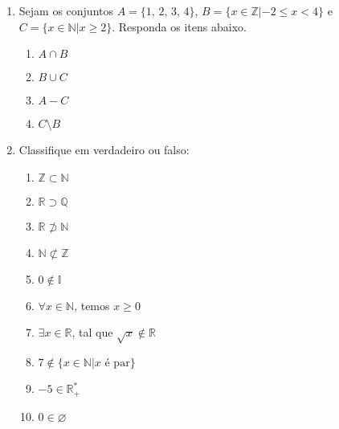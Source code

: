 \documentclass[a4paper, 12pt]{article}
\begin{document}
\begin{enumerate}
	\item Sejam os conjuntos $A = \{1,\, 2,\, 3,\, 4\}$, $B = \{x \in \mathbb{Z} | -2 \leq x < 4\}$
				e $C = \{x \in \mathbb{N} | x \geq 2\}$. Responda os itens abaixo.
		\begin{enumerate}
			\item $A \cap B$
			\item $B \cup C$
			\item $A - C$
			\item $C \setminus B$
		\end{enumerate}
	
	\item Classifique em verdadeiro ou falso:
		\begin{enumerate}
			\item $\mathbb{Z} \subset \mathbb{N}$
			\item $\mathbb{R} \supset \mathbb{Q}$
			\item $\mathbb{R} \not\supset \mathbb{N}$
			\item $\mathbb{N} \not\subset \mathbb{Z}$
			\item $0 \not\in \mathbb{I}$
			\item $\forall x \in \mathbb{N}$, temos $x \geq 0$
			\item $\exists x \in \mathbb{R}$, tal que $\sqrt{x} \not\in \mathbb{R}$
			\item $7 \not\in \{x \in \mathbb{N} | x \textrm{ é par}\}$ %
			\item $-5 \in \mathbb{R}^{*}_{+}$
			\item $0 \in \varnothing$
		\end{enumerate}
\end{enumerate}
\end{document}
